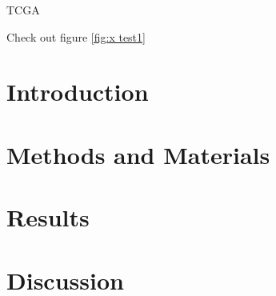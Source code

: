\documentclass[10pt, openright,oneside]{book}
\begin{document}
TCGA


Check out figure \ref{fig:x test1}\\






 

\chapter{Introduction}


\chapter{Methods and Materials}


\chapter{Results}


\chapter{Discussion}




%


\backmatter

\printbibliography
\end{document}
